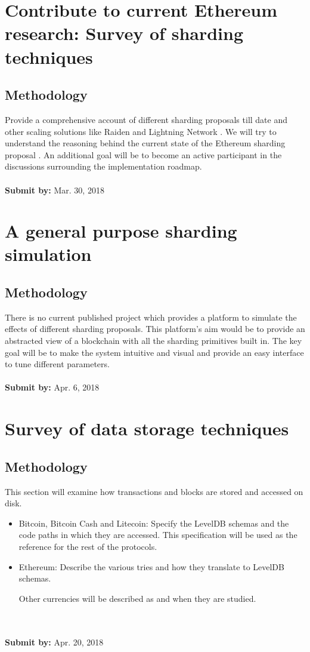 \documentclass{article}
\begin{document}
\section{Contribute to current Ethereum research: Survey of sharding techniques}
\subsection* {Methodology}
Provide a comprehensive account of different sharding proposals \cite{shard1, shard2} till date and other scaling solutions like Raiden \cite{raiden} and Lightning Network \cite{lightning}. We will try to understand the reasoning behind the current state of the Ethereum sharding proposal \cite{sharding-proposal}. An additional goal will be to become an active participant in the discussions surrounding the implementation roadmap. 
\\
\\
\textbf{Submit by: } Mar. 30, 2018

\section{A general purpose sharding simulation}
\subsection* {Methodology}
There is no current published project which provides a platform to simulate the effects of different sharding proposals. This platform's aim would be to provide an abstracted view of a blockchain with all the sharding primitives built in. The key goal will be to make the system intuitive and visual and provide an easy interface to tune different parameters.
\\
\\
\textbf{Submit by: } Apr. 6, 2018

\section{Survey of data storage techniques}
\subsection* {Methodology}
This section will examine how transactions and blocks are stored and accessed on disk.
\begin{itemize}
\item Bitcoin, Bitcoin Cash and Litecoin: Specify the LevelDB \cite{leveldb} schemas and the code paths in which they are accessed. This specification will be used as the reference for the rest of the protocols.
\item Ethereum: Describe the various tries \cite{tries} and how they translate to LevelDB schemas.

Other currencies will be described as and when they are studied.
\end{itemize}
\\
\\
\textbf{Submit by: } Apr. 20, 2018
\end{document}

